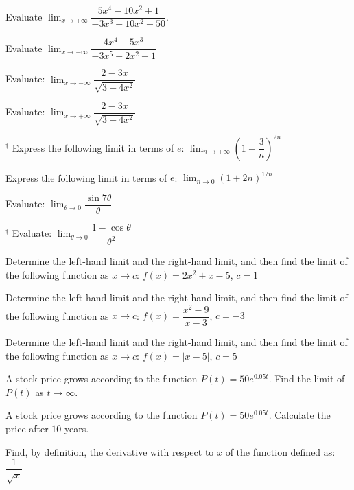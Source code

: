 \documentclass[11pt,a4paper]{article}
\begin{document}
\begin{shortlist}
\item Evaluate $\displaystyle\lim_{x\to+\infty}\dfrac{5x^4-10x^2+1}{-3x^3+10x^2+50}$.

\item Evaluate $\displaystyle\lim_{x\to-\infty}\dfrac{4x^4-5x^3}{-3x^5+2x^2+1}$

\item Evaluate: $\displaystyle\lim_{x\to-\infty}\dfrac{2-3x}{\sqrt{3+4x^2}}$

\item Evaluate: $\displaystyle\lim_{x\to+\infty}\dfrac{2-3x}{\sqrt{3+4x^2}}$

\item $^{\dagger}$ Express the following limit in terms of $e$: $\displaystyle\lim_{n\to+\infty}\left(1+\dfrac{3}{n}\right)^{2n}$

\item Express the following limit in terms of $e$: $\displaystyle\lim_{n\to0}(1+2n)^{1/n}$

\item Evaluate: $\displaystyle\lim_{\theta\to0}\dfrac{\sin7\theta}{\theta}$

\item $^{\dagger}$ Evaluate: $\displaystyle\lim_{\theta\to0}\dfrac{1-\cos\theta}{\theta^2}$

\item Determine the left-hand limit and the right-hand limit, and then find the limit of the following function as $x\to c$: $f(x)=2x^2+x-5$, $c=1$

\item Determine the left-hand limit and the right-hand limit, and then find the limit of the following function as $x\to c$: $f(x)=\dfrac{x^2-9}{x-3}$, $c=-3$

\item Determine the left-hand limit and the right-hand limit, and then find the limit of the following function as $x\to c$: $f(x)=|x-5|$, $c=5$

\item A stock price grows according to the function $P(t)=50e^{0.05t}$. Find the limit of $P(t)$ as $t\to\infty$.

\item A stock price grows according to the function $P(t)=50e^{0.05t}$. Calculate the price after $10$ years.

\item Find, by definition, the derivative with respect to $x$ of the function defined as: $\dfrac{1}{\sqrt{x}}$


\end{shortlist}
\end{document}
